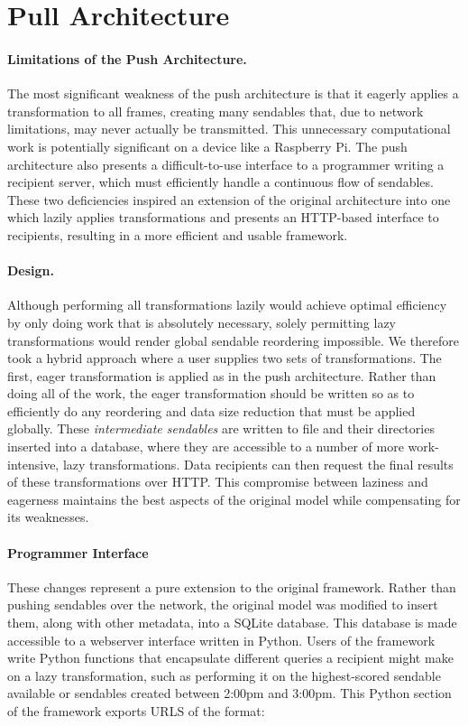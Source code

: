 \section{Pull Architecture}
\label{sec:pull}

\paragraph{Limitations of the Push Architecture.}
The most significant weakness of the push architecture is
that it eagerly applies a transformation to all frames, creating
many sendables that, due to network limitations, may never
actually be transmitted.  This unnecessary computational work is
potentially significant on a device like a Raspberry Pi. The
push architecture also presents a difficult-to-use
interface to a programmer writing a recipient server, which
must efficiently handle a continuous flow of sendables.
These two deficiencies inspired an extension of the original
architecture into one which lazily applies transformations and
presents an HTTP-based interface to recipients, resulting in a
more efficient and usable framework.

\paragraph{Design.}
Although performing all transformations lazily would achieve
optimal efficiency by only doing work that is absolutely necessary,
solely permitting lazy transformations would render global sendable
reordering impossible.  We therefore took a hybrid approach
where a user supplies two sets of transformations.  The first,
eager transformation is applied as in the push architecture.
Rather than doing all of the work, the eager transformation
should be written so as to efficiently do any reordering and
data size reduction that must be applied globally.  These
\emph{intermediate sendables} are written to file and their directories inserted into a database, where
they are accessible to a number of more work-intensive, lazy
transformations.  Data recipients can then request the final
results of these transformations over HTTP.  This compromise
between laziness and eagerness maintains the best aspects
of the original model while compensating for its weaknesses.

\paragraph{Programmer Interface}
These changes represent a pure extension to the original framework.
Rather than pushing sendables over the network, the original model
was modified to insert them, along with other metadata, into a SQLite
database.  This database is made accessible to a webserver interface
written in Python.  Users of the framework write Python functions
that encapsulate different queries a recipient might make on a lazy
transformation, such as performing it on the highest-scored sendable
available or sendables created between 2:00pm and 3:00pm.  This
Python section of the framework exports URLS of the format:

